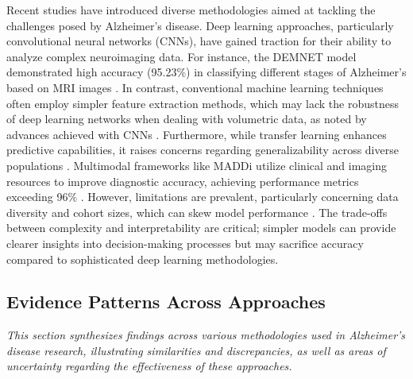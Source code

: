\documentclass{MITcsail}
\begin{document}
Recent studies have introduced diverse methodologies aimed at tackling the challenges posed by Alzheimer's disease. Deep learning approaches, particularly convolutional neural networks (CNNs), have gained traction for their ability to analyze complex neuroimaging data. For instance, the DEMNET model demonstrated high accuracy (95.23\%) in classifying different stages of Alzheimer's based on MRI images \citep{ref_10_1109_access_2021_3090474}. In contrast, conventional machine learning techniques often employ simpler feature extraction methods, which may lack the robustness of deep learning networks when dealing with volumetric data, as noted by advances achieved with CNNs \citep{ref_10_1016_j_mri_2021_02_001}. Furthermore, while transfer learning enhances predictive capabilities, it raises concerns regarding generalizability across diverse populations \citep{ref_10_3389_fpubh_2022_772592}. Multimodal frameworks like MADDi utilize clinical and imaging resources to improve diagnostic accuracy, achieving performance metrics exceeding 96\% \citep{ref_10_1093_jamia_ocac168}. However, limitations are prevalent, particularly concerning data diversity and cohort sizes, which can skew model performance \citep{ref_10_1002_alz_13390,ref_10_1016_j_ejrad_2023_110934}. The trade-offs between complexity and interpretability are critical; simpler models can provide clearer insights into decision-making processes but may sacrifice accuracy compared to sophisticated deep learning methodologies.

\subsection{Evidence Patterns Across Approaches}

\textit{This section synthesizes findings across various methodologies used in Alzheimer’s disease research, illustrating similarities and discrepancies, as well as areas of uncertainty regarding the effectiveness of these approaches.}
\end{document}
